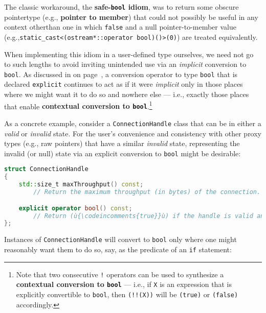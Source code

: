 \noindent The classic workaround, the \textbf{safe-\texttt{bool} idiom},
was to return some obscure pointer\linebreak[4] %
 type (e.g., \textbf{pointer to
member}) that could not possibly be useful in any context other\linebreak[4] %
 than one in which \texttt{false} and a null pointer-to-member value (e.g.,\linebreak[4] %
\texttt{static\_cast<(ostream*::operator}~\texttt{bool)()>(0)}) are
treated equivalently.

When implementing this idiom in a user-defined type ourselves, we need not go to such lengths to avoid inviting unintended use
via an \emph{implicit} conversion to \texttt{bool}. As discussed in \textit{} on page~\pageref{description-explicitconv}, a conversion operator to type
\texttt{bool} that is declared \texttt{explicit} continues to act as if
it were \emph{implicit} only in those places where we might want it to
do so and nowhere else --- i.e., exactly those places that enable
\textbf{contextual conversion to \texttt{bool}}.{\cprotect\footnote{Note that two
consecutive \texttt{!} operators can be used to synthesize a
\textbf{contextual conversion to \texttt{bool}} --- i.e., if \texttt{X} is an
expression that is explicitly convertible to \texttt{bool}, then
\texttt{(!!(X))} will be \texttt{(true)} or \texttt{(false)}
  accordingly.}}

As a concrete example, consider a \texttt{ConnectionHandle} class that
can be in either a \emph{valid} or \emph{invalid} state. For the user's
convenience and consistency with other proxy types (e.g., raw pointers)
that have a similar \emph{invalid} state, representing the invalid (or null) state via an explicit conversion to
\texttt{bool} might be desirable:

\begin{lstlisting}[language=C++]
struct ConnectionHandle
{
    std::size_t maxThroughput() const;
        // Return the maximum throughput (in bytes) of the connection.

    explicit operator bool() const;
        // Return (ù{\codeincomments{true}}ù) if the handle is valid and (ù{\codeincomments{false}}ù) otherwise.
};
\end{lstlisting}

\noindent Instances of \texttt{ConnectionHandle} will convert to \texttt{bool}
only where one might reasonably want them to do so, say, as the
predicate of an \texttt{if} statement:

